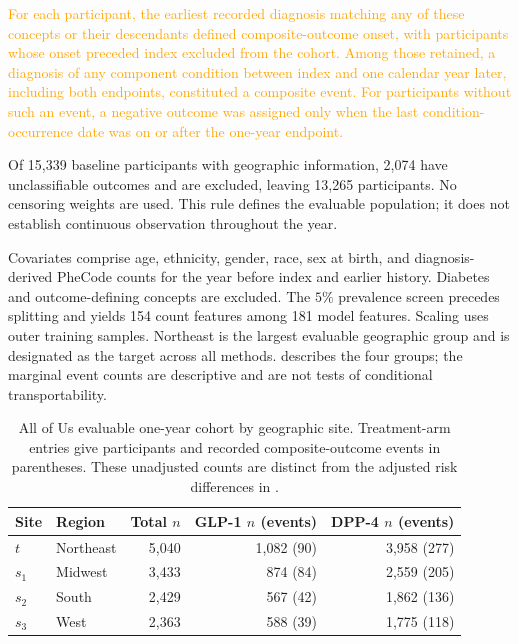 \documentclass[12pt]{article}
\begin{document}
\textcolor{orange}{For each participant, the earliest recorded diagnosis matching any of these concepts or their descendants defined composite-outcome onset, with participants whose onset preceded index excluded from the cohort. Among those retained, a diagnosis of any component condition between index and one calendar year later, including both endpoints, constituted a composite event. For participants without such an event, a negative outcome was assigned only when the last condition-occurrence date was on or after the one-year endpoint.}

Of 15,339 baseline participants with geographic information, 2,074 have unclassifiable outcomes and are excluded, leaving 13,265 participants. No censoring weights are used. This rule defines the evaluable population; it does not establish continuous observation throughout the year.

Covariates comprise age, ethnicity, gender, race, sex at birth, and diagnosis-derived PheCode counts for the year before index and earlier history. Diabetes and outcome-defining concepts are excluded. The $5\%$ prevalence screen precedes splitting and yields 154 count features among 181 model features. Scaling uses outer training samples. Northeast is the largest evaluable geographic group and is designated as the target across all methods.  describes the four groups; the marginal event counts are descriptive and are not tests of conditional transportability.

\begin{table}[!htbp]
\centering
\caption{All of Us evaluable one-year cohort by geographic site. Treatment-arm entries give participants and recorded composite-outcome events in parentheses. These unadjusted counts are distinct from the adjusted risk differences in .}
\label{tab:aou_sites}
\begin{tabular}{llrrr}
\toprule
Site & Region & Total $n$ & GLP-1 $n$ (events) & DPP-4 $n$ (events)\\
\midrule
$t$ & Northeast & 5,040 & 1,082 (90) & 3,958 (277)\\
$s_1$ & Midwest & 3,433 & 874 (84) & 2,559 (205)\\
$s_2$ & South & 2,429 & 567 (42) & 1,862 (136)\\
$s_3$ & West & 2,363 & 588 (39) & 1,775 (118)\\
\bottomrule
\end{tabular}
\end{table}
\FloatBarrier
\end{document}
